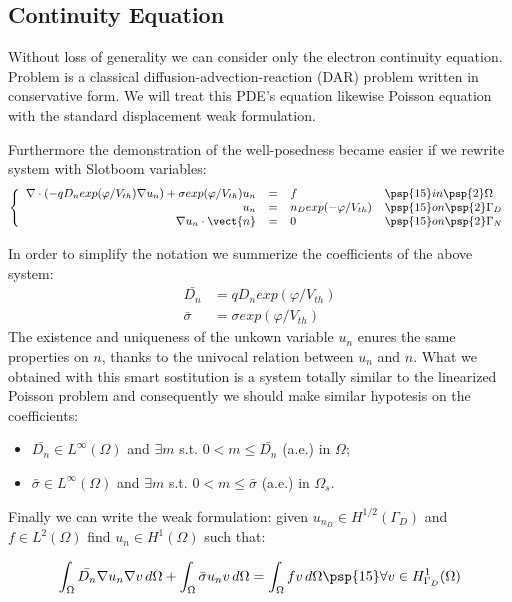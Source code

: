 \subsection{Continuity Equation}

Without loss of generality we can consider only the electron continuity equation. Problem  is a classical diffusion-advection-reaction (DAR) problem written in conservative form. We will treat this PDE's equation likewise Poisson equation with the standard displacement weak formulation.



Furthermore the demonstration of the well-posedness became easier if we rewrite system  with Slotboom variables:
\begin{equation}
\small
\left\{
\begin{array}{rcll}
 \nabla \cdot \left( - q D_n exp(\varphi/V_{th})\nabla u_n \right) + \sigma exp(\varphi/V_{th}) u_n& = & f  & \psp{15} in \psp{2} \Omega \\
u_n & = &  n_D exp(-\varphi/V_{th}) & \psp{15} on \psp{2} \Gamma_D \\
\nabla u_n \cdot \vect{n} & = & 0 & \psp{15} on \psp{2} \Gamma_N
\end{array}
\right.
\end{equation}

In order to simplify the notation we summerize the coefficients of the above system:
\begin{align*}
\bar{D_n} & = q D_n exp(\varphi/V_{th}) \\
\bar{\sigma}  & = \sigma exp(\varphi/V_{th})
\end{align*}
The existence and uniqueness of the unkown variable $u_n$ enures the same properties on $n$, thanks to the univocal relation between $u_n$ and $n$.
What we obtained with this smart sostitution is a system totally similar to the linearized Poisson problem and consequently we should make similar hypotesis on the coefficients:
\begin{itemize}
\item $\bar{D_n} \in L^{\infty}(\Omega)$ and $\exists m$ s.t. $0 < m \leq \bar{D_n}$ (a.e.) in $\Omega$;
\item  $\bar{\sigma} \in L^{\infty}(\Omega)$ and $\exists m$ s.t. $0 < m \leq \bar{\sigma}$ (a.e.) in $\Omega_s$.
\end{itemize}
Finally we can write the weak formulation: given $u_{n_D} \in H^{1/2}(\Gamma_D)$ and $f \in L^2(\Omega)$ find $u_n \in H^1(\Omega)$ such that:

\begin{equation}
\label{eq: LEC weakformulation}
\int_{\Omega} \bar{D_n} \nabla u_n \nabla v \, d\Omega + \int_{\Omega} \bar{\sigma} u_n v \, d\Omega = \int_{\Omega} f v \, d\Omega \psp{15} \forall v \in H^1_{\Gamma_D}(\Omega)
\end{equation}
